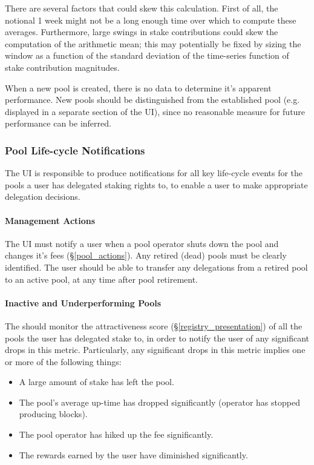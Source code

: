 There are several factors that could skew this calculation. First of all, the notional 1 week might not be a long enough time over which to compute these averages. Furthermore, large swings in stake contributions could skew the computation of the arithmetic mean; this may potentially be fixed by sizing the window as a function of the standard deviation of the time-series function of stake contribution magnitudes. 

When a new pool is created, there is no data to determine it's apparent performance. New pools should be distinguished from the established pool (e.g. displayed in a separate section of the UI), since no reasonable measure for future performance can be inferred. 

\subsubsection{Pool Life-cycle Notifications}
The UI is responsible to produce notifications for all key life-cycle events for the pools a user has delegated staking rights to, to enable a user to make appropriate delegation decisions. 

\paragraph{Management Actions}
The UI must notify a user when a pool operator shuts down the pool and changes it's fees (\S\ref{pool_actions}). Any retired (dead) pools must be clearly identified. The user should be able to transfer any delegations from a retired pool to an active pool, at any time after pool retirement. 

\paragraph{Inactive and Underperforming Pools}
The should monitor the attractiveness score (\S\ref{registry_presentation}) of all the pools the user has delegated stake to, in order to notify the user of any significant drops in this metric. Particularly, any significant drops in this metric implies one or more of the following things: 
\begin{itemize}[label=--,nosep]
    \item A large amount of stake has left the pool.
    \item The pool's average up-time has dropped significantly (operator has stopped producing blocks). 
    \item The pool operator has hiked up the fee significantly. 
    \item The rewards earned by the user have diminished significantly. 
\end{itemize}

